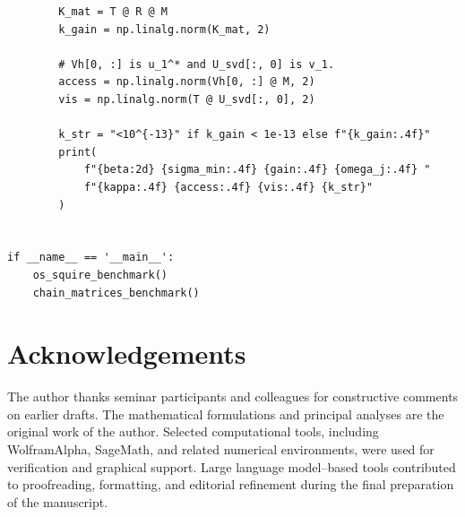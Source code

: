 \documentclass[review]{siamart220329}
\theoremstyle{definition}
\theoremstyle{remark}
\begin{document}
\begin{verbatim}
        K_mat = T @ R @ M
        k_gain = np.linalg.norm(K_mat, 2)

        # Vh[0, :] is u_1^* and U_svd[:, 0] is v_1.
        access = np.linalg.norm(Vh[0, :] @ M, 2)
        vis = np.linalg.norm(T @ U_svd[:, 0], 2)

        k_str = "<10^{-13}" if k_gain < 1e-13 else f"{k_gain:.4f}"
        print(
            f"{beta:2d} {sigma_min:.4f} {gain:.4f} {omega_j:.4f} "
            f"{kappa:.4f} {access:.4f} {vis:.4f} {k_str}"
        )


if __name__ == '__main__':
    os_squire_benchmark()
    chain_matrices_benchmark()
\end{verbatim}


\section*{Acknowledgements}
The author thanks seminar participants and colleagues for constructive comments on earlier drafts. The mathematical formulations and principal analyses are the original work of the author. Selected computational tools, including WolframAlpha, SageMath, and related numerical environments, were used for verification and graphical support. Large language model--based tools contributed to proofreading, formatting, and editorial refinement during the final preparation of the manuscript.
\end{document}
